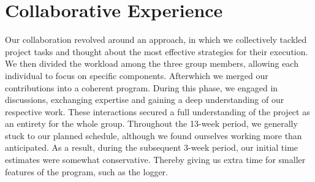 \section{Collaborative Experience}
Our collaboration revolved around an approach, in which we collectively tackled project tasks and thought about the most effective strategies for their execution. We then divided the workload among the three group members, allowing each individual to focus on specific components.
Afterwhich we merged our contributions into a coherent program. During this phase, we engaged in discussions, exchanging expertise and gaining a deep understanding of our respective work. These interactions secured a full understanding of the project as an entirety for the whole group.
Throughout the 13-week period, we generally stuck to our planned schedule, although we found ourselves working more than anticipated. As a result, during the subsequent 3-week period, our initial time estimates were somewhat conservative. Thereby giving us extra time for smaller features of the program, such as the logger.



\newpage

\listoffigures


